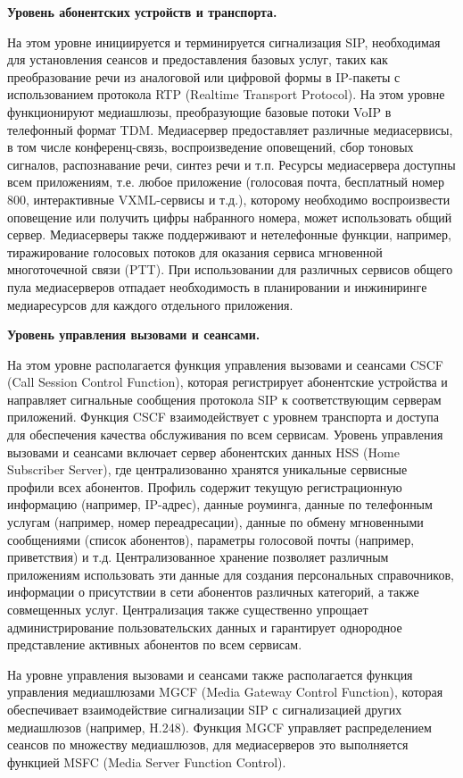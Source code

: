 \textbf{Уровень абонентских устройств и транспорта.}

На этом уровне инициируется и терминируется сигнализация SIP, необходимая для установления сеансов и предоставления базовых услуг, таких как преобразование речи из аналоговой или цифровой формы в IP-пакеты с использованием протокола RTP (Realtime Transport Protocol). На этом уровне функционируют медиашлюзы, преобразующие базовые потоки VoIP в телефонный формат TDM. Медиасервер предоставляет различные медиасервисы, в том числе конференц-связь, воспроизведение оповещений, сбор тоновых сигналов, распознавание речи, синтез речи и т.п. Ресурсы медиасервера доступны всем приложениям, т.е. любое приложение (голосовая почта, бесплатный номер 800, интерактивные VXML-сервисы и т.д.), которому необходимо воспроизвести оповещение или получить цифры набранного номера, может использовать общий сервер. Медиасерверы также поддерживают и нетелефонные функции, например, тиражирование голосовых потоков для оказания сервиса мгновенной многоточечной связи (PTT). При использовании для различных сервисов общего пула медиасерверов отпадает необходимость в планировании и инжиниринге медиаресурсов для каждого отдельного приложения.


\textbf{Уровень управления вызовами и сеансами.}

На этом уровне располагается функция управления вызовами и сеансами CSCF (Call Session Control Function), которая регистрирует абонентские устройства и направляет сигнальные сообщения протокола SIP к соответствующим серверам приложений. Функция CSCF взаимодействует с уровнем транспорта и доступа для обеспечения качества обслуживания по всем сервисам. Уровень управления вызовами и сеансами включает сервер абонентских данных HSS (Home Subscriber Server), где централизованно хранятся уникальные сервисные профили всех абонентов. Профиль содержит текущую регистрационную информацию (например, IP-адрес), данные роуминга, данные по телефонным услугам (например, номер переадресации), данные по обмену мгновенными сообщениями (список абонентов), параметры голосовой почты (например, приветствия) и т.д. Централизованное хранение позволяет различным приложениям использовать эти данные для создания персональных справочников, информации о присутствии в сети абонентов различных категорий, а также совмещенных услуг. Централизация также существенно упрощает администрирование пользовательских данных и гарантирует однородное представление активных абонентов по всем сервисам.

На уровне управления вызовами и сеансами также располагается функция управления медиашлюзами MGCF (Media Gateway Control Function), которая обеспечивает взаимодействие сигнализации SIP с сигнализацией других медиашлюзов (например, H.248). Функция MGCF управляет распределением сеансов по множеству медиашлюзов, для медиасерверов это выполняется функцией MSFC (Media Server Function Control).

